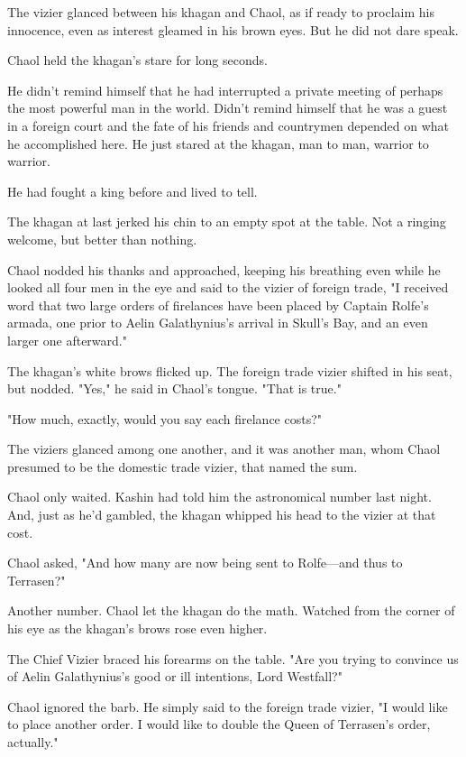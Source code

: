 The vizier glanced between his khagan and Chaol, as if ready to proclaim his innocence, even as interest gleamed in his brown eyes. But he did not dare speak.

Chaol held the khagan's stare for long seconds.

He didn't remind himself that he had interrupted a private meeting of perhaps the most powerful man in the world. Didn't remind himself that he was a guest in a foreign court and the fate of his friends and countrymen depended on what he accomplished here. He just stared at the khagan, man to man, warrior to warrior.

He had fought a king before and lived to tell.

The khagan at last jerked his chin to an empty spot at the table. Not a ringing welcome, but better than nothing.

Chaol nodded his thanks and approached, keeping his breathing even while he looked all four men in the eye and said to the vizier of foreign trade, "I received word that two large orders of firelances have been placed by Captain Rolfe's armada, one prior to Aelin Galathynius's arrival in Skull's Bay, and an even larger one afterward."

The khagan's white brows flicked up. The foreign trade vizier shifted in his seat, but nodded. "Yes," he said in Chaol's tongue. "That is true."

"How much, exactly, would you say each firelance costs?"

The viziers glanced among one another, and it was another man, whom Chaol presumed to be the domestic trade vizier, that named the sum.

Chaol only waited. Kashin had told him the astronomical number last night. And, just as he'd gambled, the khagan whipped his head to the vizier at that cost.

Chaol asked, "And how many are now being sent to Rolfe---and thus to Terrasen?"

Another number. Chaol let the khagan do the math. Watched from the corner of his eye as the khagan's brows rose even higher.

The Chief Vizier braced his forearms on the table. "Are you trying to convince us of Aelin Galathynius's good or ill intentions, Lord Westfall?"

Chaol ignored the barb. He simply said to the foreign trade vizier, "I would like to place another order. I would like to double the Queen of Terrasen's order, actually."

